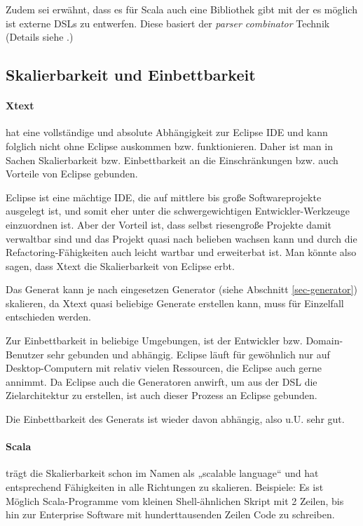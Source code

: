 Zudem sei erwähnt, dass es für Scala auch eine Bibliothek gibt mit
der es möglich ist externe DSLs zu entwerfen. Diese basiert der
\emph{parser combinator} Technik (Details siehe \cite{dsls}.)


\subsection{Skalierbarkeit und Einbettbarkeit}\label{sec-scalierEinbett}

\paragraph{Xtext} hat eine vollständige und absolute Abhängigkeit
zur Eclipse IDE und kann folglich nicht ohne Eclipse auskommen bzw.
funktionieren. Daher ist man in Sachen Skalierbarkeit bzw. Einbettbarkeit
an die Einschränkungen bzw. auch Vorteile von Eclipse gebunden.

Eclipse ist eine mächtige IDE, die auf mittlere bis große Softwareprojekte
ausgelegt ist, und somit eher unter die schwergewichtigen Entwickler-Werkzeuge
einzuordnen ist. Aber der Vorteil ist, dass selbst riesengroße Projekte
damit verwaltbar sind und das Projekt quasi nach belieben wachsen kann und
durch die Refactoring-Fähigkeiten auch leicht wartbar und erweiterbat ist.
Man könnte also sagen, dass Xtext die Skalierbarkeit von Eclipse erbt.

Das Generat kann je nach eingesetzen Generator (siehe Abschnitt
\ref{sec-generator}) skalieren, da Xtext quasi beliebige Generate erstellen
kann, muss für Einzelfall entschieden werden.

Zur Einbettbarkeit in beliebige Umgebungen, ist der Entwickler bzw.
Domain-Benutzer sehr gebunden und abhängig. Eclipse läuft für gewöhnlich
nur auf Desktop-Computern mit relativ vielen Ressourcen, die Eclipse auch
gerne annimmt. Da Eclipse auch die Generatoren anwirft, um aus der DSL
die Zielarchitektur zu erstellen, ist auch dieser Prozess an Eclipse gebunden.

Die Einbettbarkeit des Generats ist wieder davon abhängig, also u.U.
sehr gut.

\paragraph{Scala} trägt die Skalierbarkeit schon im Namen als
„scalable language“ und hat entsprechend Fähigkeiten in alle Richtungen
zu skalieren. Beispiele: Es ist Möglich Scala-Programme vom kleinen
Shell-ähnlichen Skript mit 2 Zeilen, bis hin zur Enterprise Software
mit hunderttausenden Zeilen Code zu schreiben.

